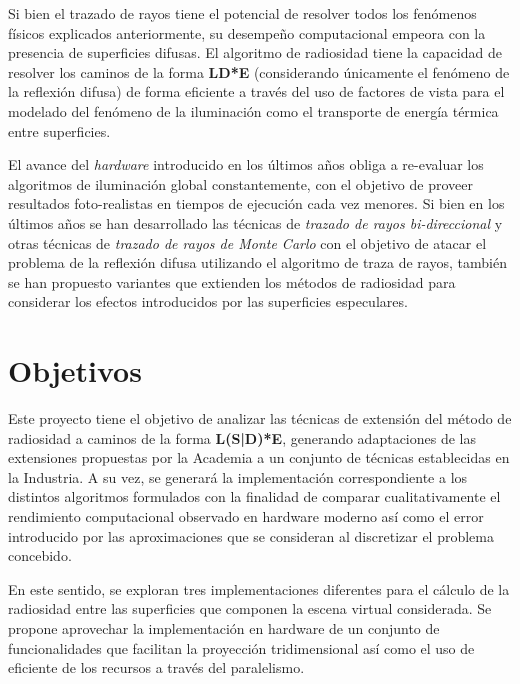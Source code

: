 Si bien el trazado de rayos tiene el potencial de resolver todos los fenómenos físicos explicados anteriormente, su desempeño computacional empeora con la presencia de superficies difusas. El algoritmo de radiosidad tiene la capacidad de resolver los caminos de la forma \textbf{LD*E} (considerando únicamente el fenómeno de la reflexión difusa) de forma eficiente a través del uso de factores de vista para el modelado del fenómeno de la iluminación como el transporte de energía térmica entre superficies.

El avance del \textit{hardware} introducido en los últimos años obliga a re-evaluar los algoritmos de iluminación global constantemente, con el objetivo de proveer resultados foto-realistas en tiempos de ejecución cada vez menores. Si bien en los últimos años se han desarrollado las técnicas de \textit{trazado de rayos bi-direccional} y otras técnicas de \textit{trazado de rayos de Monte Carlo} con el objetivo de atacar el problema de la reflexión difusa utilizando el algoritmo de traza de rayos, también se han propuesto variantes que extienden los métodos de radiosidad para considerar los efectos introducidos por las superficies especulares.


\section{Objetivos}
\label{sec:objetivos}

Este proyecto tiene el objetivo de analizar las técnicas de extensión del método de radiosidad a caminos de la forma \textbf{L(S|D)*E}, generando adaptaciones de las extensiones propuestas por la Academia a un conjunto de técnicas establecidas en la Industria. A su vez, se generará la implementación correspondiente a los distintos algoritmos formulados con la finalidad de comparar cualitativamente el rendimiento computacional observado en hardware moderno así como el error introducido por las aproximaciones que se consideran al discretizar el problema concebido.

En este sentido, se exploran tres implementaciones diferentes para el cálculo de la radiosidad entre las superficies que componen la escena virtual considerada. Se propone aprovechar la implementación en hardware de un conjunto de funcionalidades que facilitan la proyección tridimensional así como el uso de eficiente de los recursos a través del paralelismo.  

